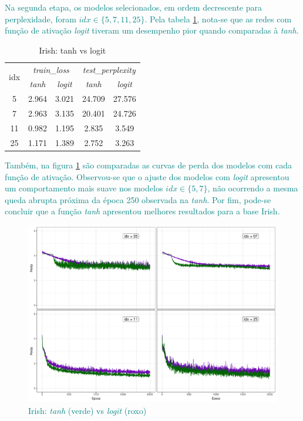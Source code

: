 \documentclass{automatextcc}
\newcommand{\nico}[1]{\textcolor{teal}{#1}}
\begin{document}
\nico{
Na segunda etapa, os modelos selecionados, em ordem decrescente para perplexidade, foram $idx \in \{5,7,11,25\}$. Pela tabela \ref{tab:irish_tanh_vs_logit}, nota-se que as redes com função de ativação \textit{logit} tiveram um desempenho pior quando comparadas à \textit{tanh}. 
}
\begin{table}
    \caption{Irish: tanh vs logit} \label{tab:irish_tanh_vs_logit}
    \centering
    \begin{tabular}{c|cc|cc}
        \toprule
        \multirow{2}{*}{idx} &
        \multicolumn{2}{c|}{\textit{train\_loss}} &
        \multicolumn{2}{c}{\textit{test\_perplexity}} \\
        & {\textit{tanh}} & {\textit{logit}} & {\textit{tanh}} & {\textit{logit}} \\
        \midrule
        5 & 2.964 & 3.021 & 24.709 & 27.576 \\
        7 & 2.963 & 3.135 & 20.401 & 24.726 \\
        11 & 0.982 & 1.195 & 2.835 & 3.549 \\
        25 & 1.171 & 1.389 & 2.752 & 3.263 \\
    \bottomrule
  \end{tabular}
\end{table}
%
\nico{
Também, na figura \ref{fig:irish_tanh_vs_logit} são comparadas as curvas de perda dos modelos com cada função de ativação. Observou-se que o ajuste dos modelos com \textit{logit} apresentou um comportamento mais suave nos modelos $idx \in \{5,7\}$, não ocorrendo a mesma queda abrupta próxima da época 250 observada na \textit{tanh}. Por fim, pode-se concluir que a função \textit{tanh} apresentou melhores resultados para a base Irish.  
}
\begin{figure}
    
    \centering
    \includegraphics[width=\textwidth]{irish_tanh_vs_logit.pdf}
    \caption{\nico{Irish: \textit{tanh} (verde) vs \textit{logit} (roxo)}}\label{fig:irish_tanh_vs_logit}
\end{figure}
\end{document}
